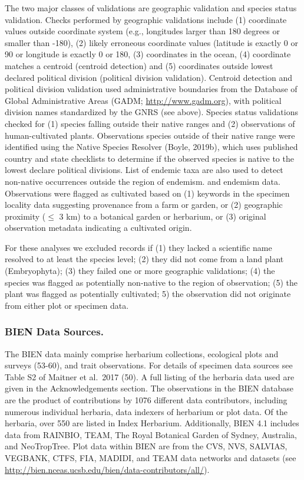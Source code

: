 \documentclass[]{article}
\begin{document}
The two major classes of validations are geographic validation and species status validation. Checks performed by geographic validations include (1) coordinate values outside coordinate system (e.g., longitudes larger than 180 degrees or smaller than -180), (2) likely erroneous coordinate values (latitude is exactly 0 or 90 or longitude is exactly 0 or 180, (3) coordinates in the ocean, (4) coordinate matches a centroid (centroid detection) and (5) coordinates outside lowest declared political division (political division validation). Centroid detection and political division validation used administrative boundaries from the Database of Global Administrative Areas (GADM; \url{http://www.gadm.org}), with political division names standardized by the GNRS (see above). Species status validations checked for (1) species falling outside their native ranges and (2) observations of human-cultivated plants. Observations species outside of their native range were identified using the Native Species Resolver (Boyle, 2019b), which uses published country and state checklists to determine if the observed species is native to the lowest declare political divisions. List of endemic taxa are also used to detect non-native occurrences outside the region of endemism. and endemism data. Observations were flagged as cultivated based on (1) keywords in the specimen locality data suggesting provenance from a farm or garden, or (2) geographic proximity (\(\leq\) 3 km) to a botanical garden or herbarium, or (3) original observation metadata indicating a cultivated origin.

For these analyses we excluded records if (1) they lacked a scientific name resolved to at least the species level; (2) they did not come from a land plant (Embryophyta); (3) they failed one or more geographic validations; (4) the species was flagged as potentially non-native to the region of observation; (5) the plant was flagged as potentially cultivated; 5) the observation did not originate from either plot or specimen data.

\hypertarget{bien-data-sources.}{%
\subsubsection{BIEN Data Sources.}\label{bien-data-sources.}}

The BIEN data mainly comprise herbarium collections, ecological plots and surveys (53-60), and trait observations. For details of specimen data sources see Table S2 of Maitner et al.~2017 (50). A full listing of the herbaria data used are given in the Acknowledgements section. The observations in the BIEN database are the product of contributions by 1076 different data contributors, including numerous individual herbaria, data indexers of herbarium or plot data. Of the herbaria, over 550 are listed in Index Herbarium. Additionally, BIEN 4.1 includes data from RAINBIO, TEAM, The Royal Botanical Garden of Sydney, Australia, and NeoTropTree. Plot data within BIEN are from the CVS, NVS, SALVIAS, VEGBANK, CTFS, FIA, MADIDI, and TEAM data networks and datasets (see \url{http://bien.nceas.ucsb.edu/bien/data-contributors/all/}).
\end{document}
